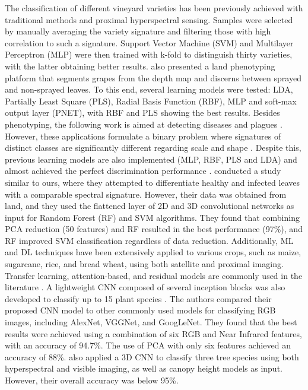The classification of different vineyard varieties has been previously achieved with traditional methods and proximal hyperspectral sensing. Samples were selected by manually averaging the variety signature and filtering those with high correlation to such a signature. Support Vector Machine (SVM) and Multilayer Perceptron (MLP) were then trained with k-fold to distinguish thirty varieties, with the latter obtaining better results. \cite{kicherer_phenoliner_2017} also presented a land phenotyping platform that segments grapes from the depth map and discerns between sprayed and non-sprayed leaves. To this end, several learning models were tested: LDA, Partially Least Square (PLS), Radial Basis Function (RBF), MLP and soft-max output layer (PNET), with RBF and PLS showing the best results. Besides phenotyping, the following work is aimed at detecting diseases \cite{nguyen_early_2021, bendel_detection_2020, bendel_evaluating_2020} and plagues \cite{mendes_vineinspector_2022}. However, these applications formulate a binary problem where signatures of distinct classes are significantly different regarding scale \cite{bendel_detection_2020} and shape \cite{bendel_detection_2020}. Despite this, previous learning models are also implemented (MLP, RBF, PLS and LDA) and almost achieved the perfect discrimination performance \cite{bendel_evaluating_2020}. \cite{nguyen_early_2021} conducted a study similar to ours, where they attempted to differentiate healthy and infected leaves with a comparable spectral signature. However, their data was obtained from land, and they used the flattened layer of 2D and 3D convolutional networks as input for Random Forest (RF) and SVM algorithms. They found that combining PCA reduction (50 features) and RF resulted in the best performance (97\%), and RF improved SVM classification regardless of data reduction. Additionally, ML and DL techniques have been extensively applied to various crops, such as maize, sugarcane, rice, and bread wheat, using both satellite and proximal imaging. Transfer learning, attention-based, and residual models are commonly used in the literature \cite{zhang_classification_2022}. A lightweight CNN composed of several inception blocks was also developed to classify up to 15 plant species \cite{liu_plant_2022}. The authors compared their proposed CNN model to other commonly used models for classifying RGB images, including AlexNet, VGGNet, and GoogLeNet. They found that the best results were achieved using a combination of six RGB and Near Infrared features, with an accuracy of 94.7\%. The use of PCA with only six features achieved an accuracy of 88\%. \cite{nezami_tree_2020} also applied a 3D CNN to classify three tree species using both hyperspectral and visible imaging, as well as canopy height models as input. However, their overall accuracy was below 95\%.

